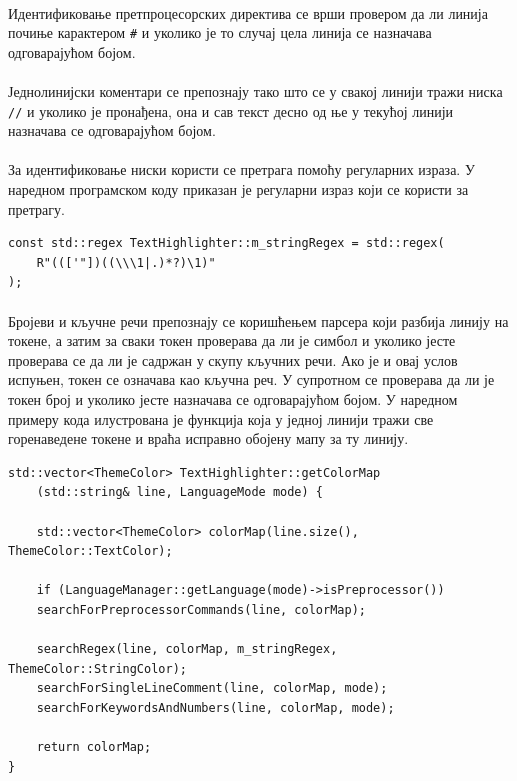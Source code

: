 \documentclass[12pt,oneside]{memoir}
\begin{document}
\paragraph{}
Идентификовање претпроцесорских директива се врши провером да ли линија почиње карактером \verb|#| и уколико је то случај цела линија се назначава одговарајућом бојом.

\paragraph{}
Једнолинијски коментари се препознају тако што се у свакој линији тражи ниска \verb|//| и уколико је пронађена, она и сав текст десно од ње у текућој линији назначава се одговарајућом бојом.

\paragraph{}
За идентификовање ниски користи се претрага помоћу регуларних израза. У наредном програмском коду приказан је регуларни израз који се користи за
претрагу.

\begin{verbatim}
const std::regex TextHighlighter::m_stringRegex = std::regex(
	R"((['"])((\\\1|.)*?)\1)"
);
\end{verbatim}

\paragraph{}
Бројеви и кључне речи препознају се коришћењем парсера који разбија линију на токене, а затим за сваки токен проверава да ли је симбол и уколико јесте проверава се да ли је садржан у скупу кључних речи. Ако је и овај услов испуњен, токен се означава 
као кључна реч. У супротном се проверава да ли је токен број и уколико јесте
назначава се одговарајућом бојом. У наредном примеру кода илустрована је функција
која у једној линији тражи све горенаведене токене и враћа исправно обојену
мапу за ту линију.

\begin{verbatim}
std::vector<ThemeColor> TextHighlighter::getColorMap
	(std::string& line, LanguageMode mode) {
		
	std::vector<ThemeColor> colorMap(line.size(), ThemeColor::TextColor);
	
	if (LanguageManager::getLanguage(mode)->isPreprocessor())
	searchForPreprocessorCommands(line, colorMap);
	
	searchRegex(line, colorMap, m_stringRegex, ThemeColor::StringColor);
	searchForSingleLineComment(line, colorMap, mode);
	searchForKeywordsAndNumbers(line, colorMap, mode);
	
	return colorMap;
}
\end{verbatim}
\end{document}
